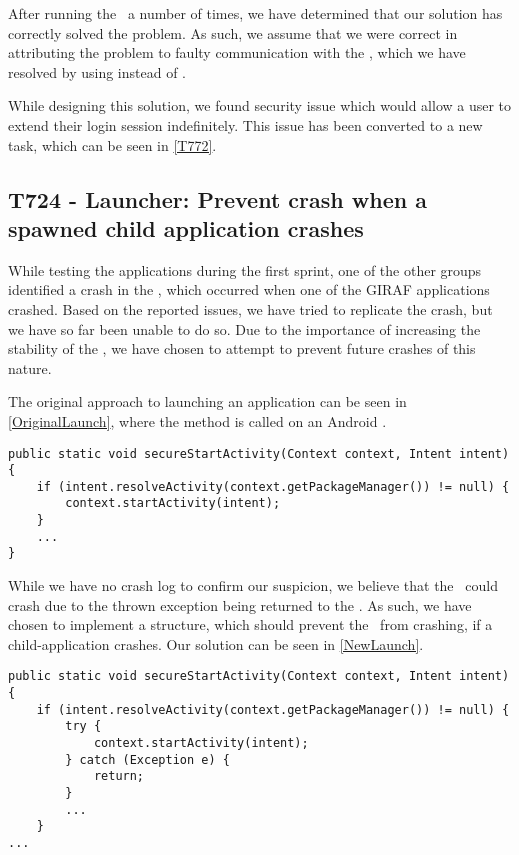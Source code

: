 After running the \lapp\ a number of times, we have determined that our solution
has correctly solved the problem. As such, we assume that we were correct in
attributing the problem to faulty communication with the
, which we have resolved by using  instead
of .\nl

While designing this solution, we found security issue which would allow a user
to extend their login session indefinitely. This issue has been converted to a
new task, which can be seen in \autoref{T772}.

\subsection{T724 - Launcher: Prevent crash when a spawned child application
crashes} 
While testing the applications during the first sprint, one of the other groups
identified a crash in the \lapp, which occurred when one of the GIRAF
applications crashed. Based on the reported issues, we have tried to replicate
the crash, but we have so far been unable to do so. Due to the importance of
increasing the stability of the \lapp, we have chosen to attempt to prevent
future crashes of this nature.\nl

The original approach to launching an application can be seen in
\autoref{OriginalLaunch}, where the  method is called on an
Android .\nl

\begin{minipage}[H]{\linewidth}
\begin{lstlisting}[caption = Original approach to launching applications., label = OriginalLaunch]
public static void secureStartActivity(Context context, Intent intent) {
	if (intent.resolveActivity(context.getPackageManager()) != null) {	
    	context.startActivity(intent);
	}
	...
}
\end{lstlisting}
\end{minipage}

While we have no crash log to confirm our suspicion, we believe that the \lapp\
could crash due to the thrown exception being returned to the \lapp. As such, we
have chosen to implement a \ttt{try-catch} structure, which should prevent the
\lapp\ from crashing, if a child-application crashes. Our solution can be seen
in \autoref{NewLaunch}.\nl

\begin{minipage}[H]{\linewidth}
\begin{lstlisting}[caption = New approach to launching applications., label = NewLaunch] 
public static void secureStartActivity(Context context, Intent intent) {
	if (intent.resolveActivity(context.getPackageManager()) != null) {
    	try {
        	context.startActivity(intent);
        } catch (Exception e) {
        	return;
        }
        ...
    }
...
\end{lstlisting}
\end{minipage}

